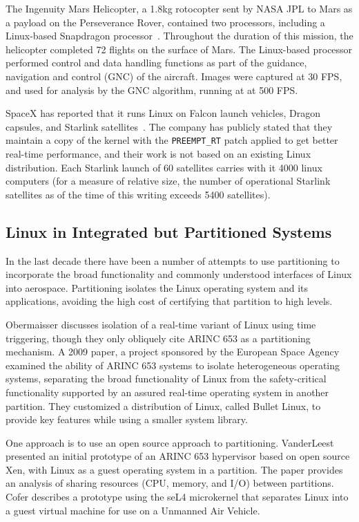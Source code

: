 The Ingenuity Mars Helicopter, a 1.8kg rotocopter sent by NASA JPL to Mars as a
payload on the Perseverance Rover, contained two processors, including a
Linux-based Snapdragon processor~\cite{canham2022}.
%
Throughout the duration of this mission, the helicopter completed 72 flights on
the surface of Mars.
%
The Linux-based processor performed control and data handling functions as part
of the guidance, navigation and control (GNC) of the aircraft.
%
Images were captured at 30 FPS, and used for analysis by the GNC algorithm,
running at at 500 FPS.

SpaceX has reported that it runs Linux on Falcon launch vehicles, Dragon
capsules, and Starlink satellites~\cite{spacexama2020}.
%
The company has publicly stated that they maintain a copy of the kernel with the
\texttt{PREEMPT\_RT} patch applied to get better real-time performance, and their
work is not based on an existing Linux distribution.
%
Each Starlink launch of 60 satellites carries with it 4000 linux computers (for
a measure of relative size, the number of operational Starlink satellites as of
the time of this writing exceeds 5400 satellites).

\subsection{Linux in Integrated but Partitioned Systems}

In the last decade there have been a number of attempts to use partitioning to incorporate the broad functionality and commonly understood interfaces of Linux into aerospace. Partitioning isolates the Linux operating system and its applications, avoiding the high cost of certifying that partition to high levels.

Obermaisser \cite{obermaisser2008temporal} discusses isolation of a real-time variant of Linux using time triggering, though they only obliquely cite ARINC 653 as a partitioning mechanism. A 2009 paper\cite{craveiro2009}, a project sponsored by the European Space Agency examined the ability of ARINC 653 systems to isolate heterogeneous operating systems, separating the broad functionality of Linux from the safety-critical functionality supported by an assured real-time operating system in another partition. They customized a distribution of Linux, called Bullet Linux, to provide key features while using a smaller system library.

One approach is to use an open source approach to partitioning. VanderLeest \cite{vanderleest2010arinc} presented an initial prototype of an ARINC 653 hypervisor based on open source Xen, with Linux as a guest operating system in a partition. The paper provides an analysis of sharing resources (CPU, memory, and I/O) between partitions. Cofer \cite{cofer2022cyberassured} describes a prototype using the seL4 microkernel that separates Linux into a guest virtual machine for use on a Unmanned Air Vehicle.

